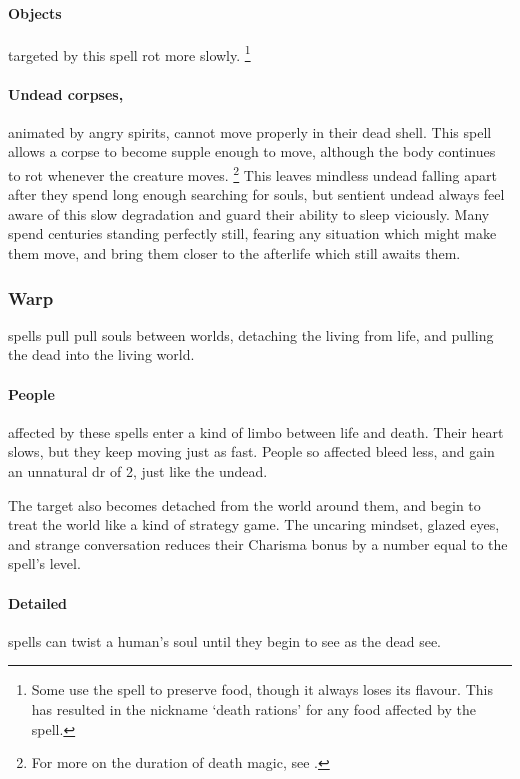 \begin{multicols}{2}
\paragraph{Objects}
    targeted by this spell rot more slowly.
    \footnote{Some use the spell to preserve food, though it always loses its flavour.
    This has resulted in the nickname `death rations' for any food affected by the spell.}

\paragraph{Undead corpses,}
    animated by angry spirits, cannot move properly in their dead shell.
    This spell allows a corpse to become supple enough to move, although the body continues to rot whenever the creature moves.%
      \footnote{For more on the duration of death magic, see .}
      This leaves mindless undead falling apart after they spend long enough searching for souls, but sentient undead always feel aware of this slow degradation and guard their ability to sleep viciously.
      Many spend centuries standing perfectly still, fearing any situation which might make them move, and bring them closer to the afterlife which still awaits them.

\subsubsection{Warp}
spells pull pull souls between worlds, detaching the living from life, and pulling the dead into the living world.

\paragraph{People}
affected by these spells enter a kind of limbo between life and death.
Their heart slows, but they keep moving just as fast.
People so affected bleed less, and gain an unnatural \gls{dr} of 2, just like the undead.

The target also becomes detached from the world around them, and begin to treat the world like a kind of strategy game.
The uncaring mindset, glazed eyes, and strange conversation reduces their Charisma bonus by a number equal to the spell's level.

\paragraph{Detailed}
spells can twist a human's soul until they begin to see as the dead see.%


\end{multicols}

